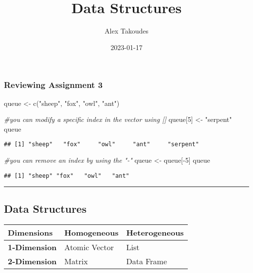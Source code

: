 \documentclass[
]{article}
\title{Data Structures}
\author{Alex Takoudes}
\date{2023-01-17}
\newenvironment{Shaded}{\begin{snugshade}}{\end{snugshade}}
\newcommand{\CommentTok}[1]{\textcolor[rgb]{0.56,0.35,0.01}{\textit{#1}}}
\newcommand{\DecValTok}[1]{\textcolor[rgb]{0.00,0.00,0.81}{#1}}
\newcommand{\FunctionTok}[1]{\textcolor[rgb]{0.00,0.00,0.00}{#1}}
\newcommand{\NormalTok}[1]{#1}
\newcommand{\OtherTok}[1]{\textcolor[rgb]{0.56,0.35,0.01}{#1}}
\newcommand{\SpecialCharTok}[1]{\textcolor[rgb]{0.00,0.00,0.00}{#1}}
\newcommand{\StringTok}[1]{\textcolor[rgb]{0.31,0.60,0.02}{#1}}
\begin{document}
\maketitle

\hypertarget{reviewing-assignment-3}{%
\subsubsection{Reviewing Assignment 3}\label{reviewing-assignment-3}}

\begin{Shaded}
\begin{Highlighting}[]
\NormalTok{queue }\OtherTok{\textless{}{-}} \FunctionTok{c}\NormalTok{(}\StringTok{"sheep"}\NormalTok{, }\StringTok{"fox"}\NormalTok{, }\StringTok{"owl"}\NormalTok{, }\StringTok{"ant"}\NormalTok{)}

\CommentTok{\#you can modify a specific index in the vector using []}
\NormalTok{queue[}\DecValTok{5}\NormalTok{] }\OtherTok{\textless{}{-}} \StringTok{"serpent"}
\NormalTok{queue}
\end{Highlighting}
\end{Shaded}

\begin{verbatim}
## [1] "sheep"   "fox"     "owl"     "ant"     "serpent"
\end{verbatim}

\begin{Shaded}
\begin{Highlighting}[]
\CommentTok{\#you can remove an index by using the "{-}"}
\NormalTok{queue }\OtherTok{\textless{}{-}}\NormalTok{ queue[}\SpecialCharTok{{-}}\DecValTok{5}\NormalTok{]}
\NormalTok{queue}
\end{Highlighting}
\end{Shaded}

\begin{verbatim}
## [1] "sheep" "fox"   "owl"   "ant"
\end{verbatim}

\begin{center}\rule{0.5\linewidth}{0.5pt}\end{center}

\hypertarget{data-structures}{%
\subsection{Data Structures}\label{data-structures}}

\begin{longtable}[]{@{}lll@{}}
\toprule()
Dimensions & Homogeneous & Heterogeneous \\
\midrule()
\endhead
\textbf{1-Dimension} & Atomic Vector & List \\
\textbf{2-Dimension} & Matrix & Data Frame \\
\bottomrule()
\end{longtable}
\end{document}
